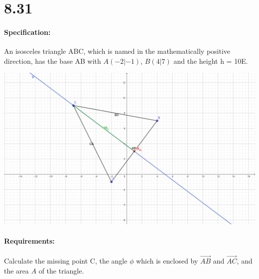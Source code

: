 \section{8.31}
\paragraph{Specification:}
An isosceles triangle ABC, which is named in the mathematically positive direction, has the 
base AB with $A(-2|-1)$, $B(4|7)$ and the height h = 10E. 

\includegraphics[width=\linewidth]{images/8-31.png}

\paragraph{Requirements:}
Calculate the missing point C, the angle $\phi$ which is enclosed by $\vec{AB}$ and $\vec{AC}$, 
and the area $A$ of the triangle.

\def\height{10}

\def\A{\begin{pmatrix}
    -2 \\ 
    -1
\end{pmatrix}}

\def\B{\begin{pmatrix}
    4 \\ 
    7
\end{pmatrix}}

\def\AB{\begin{pmatrix}
    6 \\ 
    8
\end{pmatrix}}

\def\vAC{\begin{pmatrix}
    -5 \\ 
    10
\end{pmatrix}}

